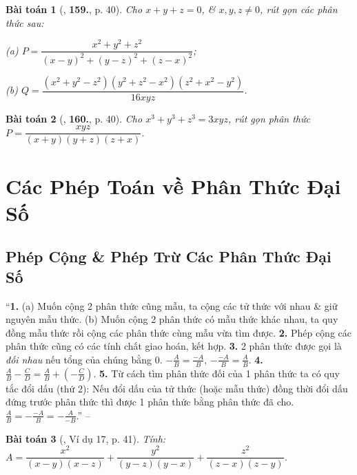 \documentclass{article}
\numberwithin{equation}{section}
\newtheorem{baitoan}{Bài toán}
\begin{document}
\begin{baitoan}[\cite{Tuyen_Toan_8}, \textbf{159.}, p. 40]
	Cho $x + y + z = 0$, \& $x,y,z\ne 0$, rút gọn các phân thức sau:
	
	\begin{enumerate*}
		\item[(a)] $P = \dfrac{x^2 + y^2 + z^2}{(x - y)^2 + (y - z)^2 + (z - x)^2}$;
		\item[(b)] $Q = \dfrac{(x^2 + y^2 - z^2)(y^2 + z^2 - x^2)(z^2 + x^2 - y^2)}{16xyz}$.
	\end{enumerate*}
\end{baitoan}

\begin{baitoan}[\cite{Tuyen_Toan_8}, \textbf{160.}, p. 40]
	Cho $x^3 + y^3 + z^3 = 3xyz$, rút gọn phân thức $P = \dfrac{xyz}{(x + y)(y + z)(z + x)}$.
\end{baitoan}


\section{Các Phép Toán về Phân Thức Đại Số}

\subsection{Phép Cộng \& Phép Trừ Các Phân Thức Đại Số}
``\textbf{1.} (a) Muốn cộng 2 phân thức cũng mẫu, ta cộng các tử thức với nhau \& giữ nguyên mẫu thức. (b) Muốn cộng 2 phân thức có mẫu thức khác nhau, ta quy đồng mẫu thức rồi cộng các phân thức cùng mẫu vừa tìm được. \textbf{2.} Phép cộng các phân thức cũng có các tính chất giao hoán, kết hợp. \textbf{3.} 2 phân thức được gọi là \textit{đối nhau} nếu tổng của chúng bằng 0. $-\frac{A}{B} = \frac{-A}{B}$, $-\frac{-A}{B} = \frac{A}{B}$. \textbf{4.} $\frac{A}{B} - \frac{C}{D} = \frac{A}{B} + \left(-\frac{C}{D}\right)$. \textbf{5.} Từ cách tìm phân thức đối của 1 phân thức ta có quy tắc đổi dấu (thứ 2): Nếu đổi dấu của tử thức (hoặc mẫu thức) đồng thời đổi dấu đứng trước phân thức thì được 1 phân thức bằng phân thức đã cho. $\frac{A}{B} = -\frac{-A}{B} = -\frac{A}{-B}$.'' -- \cite[Chap. 2, \S2, p. 40]{Tuyen_Toan_8}

\begin{baitoan}[\cite{Tuyen_Toan_8}, Ví dụ 17, p. 41]
	Tính: $A = \dfrac{x^2}{(x - y)(x - z)} + \dfrac{y^2}{(y - z)(y - x)} + \dfrac{z^2}{(z - x)(z - y)}$.
\end{baitoan}
\end{document}
